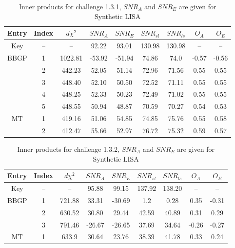 \documentclass[prd,aps,amsfonts,amsmath, nofootinbib]{revtex4}
\begin{document}
\begin{table}
\caption{\label{OlapsTable1.3.1} Inner products for challenge 1.3.1,
$SNR_A$ and $SNR_E$ are given for Synthetic LISA}
\begin{ruledtabular}
\begin{tabular}{|c|c|c|c|c|c|c|c|c|}
Entry & Index & $d\chi^2$ & $SNR_A$ & $SNR_E$ & $SNR_{sl}$ & $SNR_{ls}$ &  $O_A$ & $O_E$\\
\hline
Key  & -- & -- & 92.22 & 93.01 & 130.98 & 130.98 & -- & -- \\
\hline
BBGP & 1  &  1022.81 & -53.92 & -51.94 & 74.86 & 74.0 & -0.57 & -0.56 \\
     & 2  &  442.23  &  52.05 & 51.14  & 72.96 & 71.56 & 0.55 & 0.55 \\
     & 3  &  448.40  &  52.10 & 50.50  & 72.52 & 71.11 & 0.55 & 0.55 \\
     & 4  &  448.25  &  52.33 & 50.23  & 72.49 & 71.02 & 0.55 & 0.55 \\
     & 5  &  448.55  &  50.94 & 48.87  & 70.59 & 70.27 & 0.54 & 0.53 \\
\hline
MT   & 1  & 419.16 & 51.06 & 54.85 & 74.85 & 75.76 & 0.55 & 0.58 \\
     & 2  & 412.47 & 55.66  & 52.97 & 76.72 & 75.32 & 0.59 & 0.57 \\
\hline
\end{tabular}
\end{ruledtabular}
\end{table}

\begin{table}
\caption{\label{OlapsTable1.3.2} Inner products for challenge 1.3.2,
 $SNR_A$ and $SNR_E$ are given for Synthetic LISA}
\begin{ruledtabular}
\begin{tabular}{|c|c|c|c|c|c|c|c|c|}
Entry & Index & $d\chi^2$ & $SNR_A$ & $SNR_E$ & $SNR_{sl}$ & $SNR_{ls}$ & $O_A$ & $O_E$\\
\hline
Key  & -- & -- & 95.88 & 99.15 & 137.92 & 138.20 & -- & -- \\
\hline
BBGP & 1  & 721.88 & 33.31 & -30.69 & 1.2 & 0.28 & 0.35 & -0.31 \\
     & 2  & 630.52  & 30.80  & 29.44 & 42.59 & 40.89 & 0.31 & 0.29 \\
     & 3  & 791.46  & -26.67 & -26.65 & 37.69 & 34.64 & -0.26 & -0.27 \\
\hline
MT   & 1  & 633.9 & 30.64  & 23.76 & 38.39 & 41.78 & 0.33 & 0.24 \\
\hline
\end{tabular}
\end{ruledtabular}
\end{table}
\end{document}
